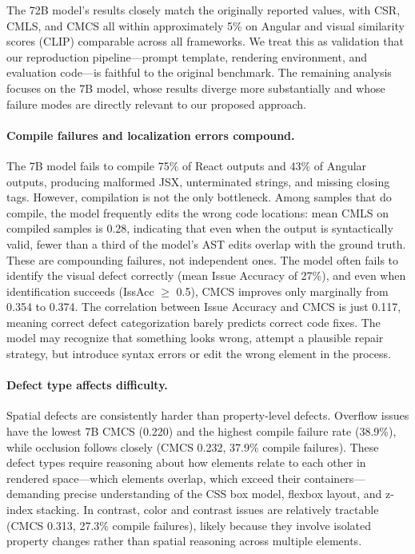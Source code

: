 \documentclass[11pt]{article}
\begin{document}
The 72B model's results closely match the originally reported values,
with CSR, CMLS, and CMCS all within approximately 5\% on Angular and
visual similarity scores (CLIP) comparable across all frameworks. We
treat this as validation that our reproduction pipeline---prompt
template, rendering environment, and evaluation code---is faithful to
the original benchmark. The remaining analysis focuses on the 7B model,
whose results diverge more substantially and whose failure modes are
directly relevant to our proposed approach.

\paragraph{Compile failures and localization errors compound.}
The 7B model fails to compile 75\% of React outputs and 43\% of Angular
outputs, producing malformed JSX, unterminated strings, and missing
closing tags. However, compilation is not the only bottleneck. Among
samples that do compile, the model frequently edits the wrong code
locations: mean CMLS on compiled samples is 0.28, indicating that even
when the output is syntactically valid, fewer than a third of the
model's AST edits overlap with the ground truth. These are compounding
failures, not independent ones. The model often fails to identify the
visual defect correctly (mean Issue Accuracy of 27\%), and even when
identification succeeds (IssAcc $\geq$ 0.5), CMCS improves only
marginally from 0.354 to 0.374. The correlation between Issue Accuracy
and CMCS is just 0.117, meaning correct defect categorization barely
predicts correct code fixes. The model may recognize that something
looks wrong, attempt a plausible repair strategy, but introduce syntax
errors or edit the wrong element in the process.

\paragraph{Defect type affects difficulty.}
Spatial defects are consistently harder than property-level defects.
Overflow issues have the lowest 7B CMCS (0.220) and the highest compile
failure rate (38.9\%), while occlusion follows closely (CMCS 0.232,
37.9\% compile failures). These defect types require reasoning about
how elements relate to each other in rendered space---which elements
overlap, which exceed their containers---demanding precise understanding
of the CSS box model, flexbox layout, and z-index stacking. In
contrast, color and contrast issues are relatively tractable (CMCS
0.313, 27.3\% compile failures), likely because they involve isolated
property changes rather than spatial reasoning across multiple elements.
\end{document}
